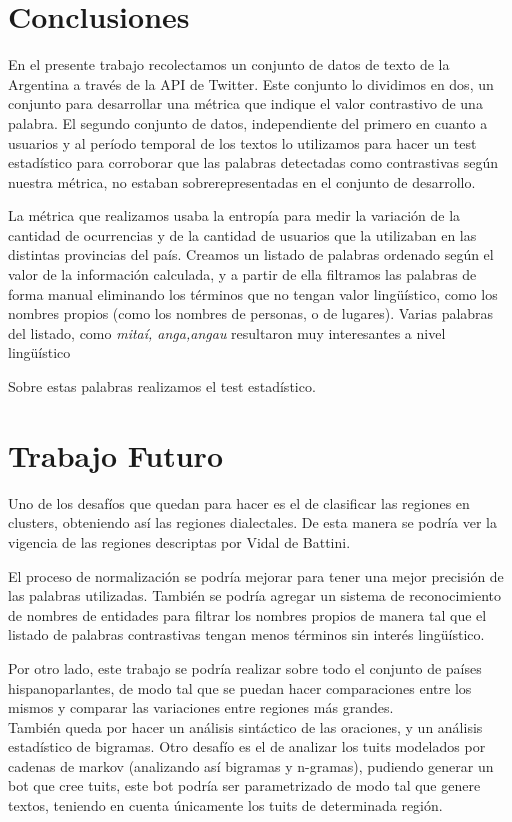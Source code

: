 
\section{Conclusiones}
En el presente trabajo recolectamos un conjunto de datos de texto de la Argentina a través de la API de Twitter. Este conjunto lo dividimos en dos, un conjunto para desarrollar una métrica que indique el valor contrastivo de una palabra. El segundo conjunto de datos, independiente del primero en cuanto a usuarios y al período temporal de los textos lo utilizamos para hacer un test estadístico para corroborar que las palabras detectadas como contrastivas según nuestra métrica, no estaban sobrerepresentadas en el conjunto de desarrollo.

La métrica que realizamos usaba la entropía para medir la variación de la cantidad de ocurrencias y de la cantidad de usuarios que la utilizaban en las distintas provincias del país. Creamos un listado de palabras ordenado según el valor de la información calculada, y a partir de ella filtramos las palabras de forma manual eliminando los términos que no tengan valor lingüístico, como los nombres propios (como los nombres de personas, o de lugares). Varias palabras del listado, como \textit{mitaí, anga,angau} resultaron muy interesantes a nivel lingüístico


Sobre estas palabras realizamos el test estadístico. 

\section{Trabajo Futuro}

Uno de los desafíos que quedan para hacer es el de clasificar las regiones en clusters, obteniendo así las regiones dialectales. De esta manera se podría ver la vigencia de las regiones descriptas por Vidal de Battini. %

El proceso de normalización se podría mejorar para tener una mejor precisión de las palabras utilizadas. También se podría agregar un sistema de reconocimiento de nombres de entidades para filtrar los nombres propios de manera tal que el listado de palabras contrastivas tengan menos términos sin interés lingüístico.

Por otro lado, este trabajo se podría realizar sobre todo el conjunto de países hispanoparlantes, de modo tal que se puedan hacer comparaciones entre los mismos y comparar las variaciones entre regiones más grandes.\\

También queda por hacer un análisis sintáctico de las oraciones, y un análisis estadístico de bigramas.
Otro desafío es el de analizar los tuits modelados por cadenas de markov (analizando así bigramas y n-gramas), pudiendo generar un bot que cree tuits, este bot podría ser parametrizado de modo tal que genere textos, teniendo en cuenta únicamente los tuits de determinada región.

